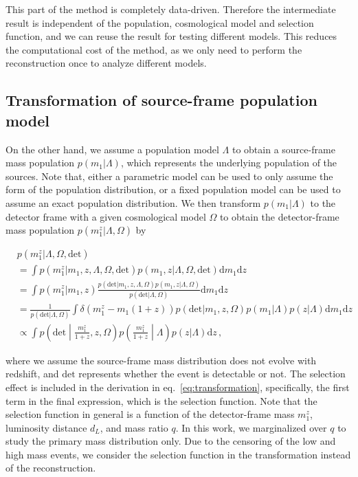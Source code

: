 \documentclass[aps,prd,twocolumn,superscriptaddress,preprintnumbers,nofootinbib,hidelinks]{revtex4-2}
\begin{document}
This part of the method is completely data-driven.
Therefore the intermediate result is independent of the population, cosmological model and selection function, and we can reuse the result for testing different models.
This reduces the computational cost of the method, as we only need to perform the reconstruction once to analyze different models.

\subsection{Transformation of source-frame population model}
\label{sec:transformation}

On the other hand, we assume a population model $\Lambda$ to obtain a source-frame mass population $p(m_1|\Lambda)$, which represents the underlying population of the sources.
Note that, either a parametric model can be used to only assume the form of the population distribution, or a fixed population model can be used to assume an exact population distribution.
We then transform $p(m_1|\Lambda)$ to the detector frame with a given cosmological model $\Omega$ to obtain the detector-frame mass population $p(m^z_1|\Lambda, \Omega)$ by
\begin{widetext}
    \begin{equation}
        \label{eq:transformation}
        \begin{split}
            &p(m^z_1|\Lambda, \Omega, \mathrm{det}) \\
            &= \int p(m^z_1|m_1, z, \Lambda, \Omega, \mathrm{det}) p(m_1, z|\Lambda, \Omega, \mathrm{det}) \mathrm{d}m_1 \mathrm{d}z \\
            &= \int p(m^z_1|m_1, z) \frac{p(\mathrm{det}|m_1, z, \Lambda, \Omega)p(m_1, z|\Lambda, \Omega)}{p(\mathrm{det}|\Lambda, \Omega)} \mathrm{d}m_1 \mathrm{d}z \\
            &= \frac{1}{p(\mathrm{det}|\Lambda, \Omega)}\int \delta(m^z_1-m_1(1+z))p(\mathrm{det}|m_1, z, \Omega)p(m_1|\Lambda)p(z|\Lambda) \mathrm{d}m_1 \mathrm{d}z \\
            &\propto \int p\left(\mathrm{det}\middle|\frac{m^z_1}{1+z},z,\Omega\right)p\left(\frac{m^z_1}{1+z}\middle|\Lambda\right)p(z|\Lambda) \mathrm{d}z\,,
        \end{split}
    \end{equation}
\end{widetext}
where we assume the source-frame mass distribution does not evolve with redshift, and $\mathrm{det}$ represents whether the event is detectable or not.
The selection effect is included in the derivation in eq.~\eqref{eq:transformation}, specifically, the first term in the final expression, which is the selection function.
Note that the selection function in general is a function of the detector-frame mass $m^z_1$, luminosity distance $d_L$, and mass ratio $q$.
In this work, we marginalized over $q$ to study the primary mass distribution only.
Due to the censoring of the low and high mass events, we consider the selection function in the transformation instead of the reconstruction.
\end{document}
